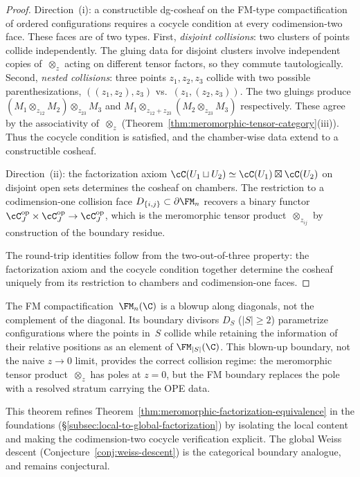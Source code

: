 \begin{proof}
Direction~(i): a constructible dg-cosheaf on the
FM-type compactification of ordered configurations requires a
cocycle condition at every codimension-two face. These faces
are of two types. First, \emph{disjoint collisions}: two
clusters of points collide independently. The gluing data for
disjoint clusters involve independent copies of~$\otimes_z$
acting on different tensor factors, so they commute
tautologically. Second, \emph{nested collisions}: three points
$z_1, z_2, z_3$ collide with two possible parenthesizations,
$((z_1, z_2), z_3)$ vs.\ $(z_1, (z_2, z_3))$. The two
gluings produce $(M_1 \otimes_{z_{12}} M_2) \otimes_{z_{23}} M_3$
and $M_1 \otimes_{z_{12}+z_{23}} (M_2 \otimes_{z_{23}} M_3)$
respectively. These agree by the associativity of~$\otimes_z$
(Theorem~\ref{thm:meromorphic-tensor-category}(iii)). Thus the
cocycle condition is satisfied, and the chamber-wise data extend
to a constructible cosheaf.

Direction~(ii): the factorization axiom
$\cC(U_1 \sqcup U_2) \simeq \cC(U_1) \boxtimes \cC(U_2)$
on disjoint open sets determines the cosheaf on chambers. The
restriction to a codimension-one collision face
$D_{\{i,j\}} \subset \partial \FM_n$ recovers a binary functor
$\cC_J^{\mathrm{op}} \times \cC_J^{\mathrm{op}} \to
\cC_J^{\mathrm{op}}$, which is the meromorphic tensor
product~$\otimes_{z_{ij}}$ by construction of the boundary
residue.

The round-trip identities follow from the two-out-of-three
property: the factorization axiom and the cocycle condition
together determine the cosheaf uniquely from its restriction
to chambers and codimension-one faces.
\end{proof}

\begin{remark}
\label{rem:fm-collision-regulator}
The FM compactification~$\FM_n(\C)$ is a blowup along diagonals,
not the complement of the diagonal. Its boundary divisors
$D_S$ ($|S| \ge 2$) parametrize configurations where the
points in~$S$ collide while retaining the information of their
relative positions as an element of $\FM_{|S|}(\C)$.
This blown-up boundary, not the naive $z \to 0$ limit,
provides the correct collision regime:
the meromorphic tensor product~$\otimes_z$ has poles at $z = 0$,
but the FM boundary replaces the pole with a resolved stratum
carrying the OPE data.
\end{remark}

\begin{remark}
This theorem refines
Theorem~\ref{thm:meromorphic-factorization-equivalence}
in the foundations (\S\ref{subsec:local-to-global-factorization})
by isolating the local content and making the codimension-two
cocycle verification explicit. The global Weiss descent
(Conjecture~\ref{conj:weiss-descent}) is the categorical
boundary analogue, and remains conjectural.
\end{remark}

